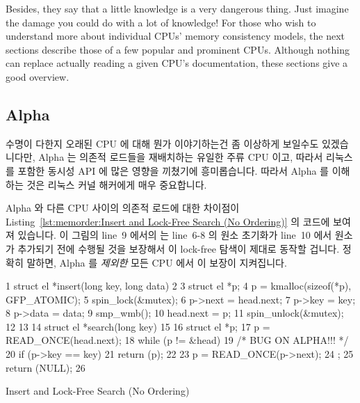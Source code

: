 Besides, they say that a little knowledge is a very dangerous thing.
Just imagine the damage you could do with a lot of knowledge!
For those who wish to understand more about individual CPUs'
memory consistency models, the next sections describe those of a few
popular and prominent CPUs.
Although nothing can replace actually reading a given CPU's documentation,
these sections give a good overview.
\fi

\subsection{Alpha}
\label{sec:memorder:Alpha}

수명이 다한지 오래된 CPU 에 대해 뭔가 이야기하는건 좀 이상하게 보일수도
있겠습니다만, Alpha 는 의존적 로드들을 재배치하는 유일한 주류 CPU 이고, 따라서
리눅스를 포함한 동시성 API 에 많은 영향을 끼쳤기에 흥미롭습니다.
따라서 Alpha 를 이해하는 것은 리눅스 커널 해커에게 매우 중요합니다.

Alpha 와 다른 CPU 사이의 의존적 로드에 대한 차이점이
Listing~\ref{lst:memorder:Insert and Lock-Free Search (No Ordering)}
의 코드에 보여져 있습니다.
이 그림의 line~9 에서의  는 line~6-8 의 원소 초기화가 line~10
에서 원소가 추가되기 전에 수행될 것을 보장해서 이 lock-free 탐색이 제대로
동작할 겁니다.
정확히 말하면, Alpha 를 {\em 제외한} 모든 CPU 에서 이 보장이 지켜집니다.

\begin{listing}[tbp]
{ \scriptsize
\begin{verbbox}
  1 struct el *insert(long key, long data)
  2 {
  3     struct el *p;
  4     p = kmalloc(sizeof(*p), GFP_ATOMIC);
  5     spin_lock(&mutex);
  6     p->next = head.next;
  7     p->key = key;
  8     p->data = data;
  9     smp_wmb();
 10     head.next = p;
 11     spin_unlock(&mutex);
 12 }
 13
 14 struct el *search(long key)
 15 {
 16     struct el *p;
 17     p = READ_ONCE(head.next);
 18     while (p != &head) {
 19         /* BUG ON ALPHA!!! */
 20         if (p->key == key) {
 21             return (p);
 22         }
 23         p = READ_ONCE(p->next);
 24     };
 25     return (NULL);
 26 }
\end{verbbox}
}
\centering
\theverbbox
\caption{Insert and Lock-Free Search (No Ordering)}
\label{lst:memorder:Insert and Lock-Free Search (No Ordering)}
\end{listing}

